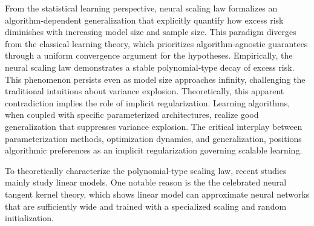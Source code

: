 From the statistical learning perspective, neural scaling law formalizes an algorithm-dependent generalization that explicitly quantify how excess risk diminishes with increasing model size and sample size. This paradigm diverges from the classical learning theory, which prioritizes algorithm-agnostic guarantees through a uniform convergence argument for the hypotheses. Empirically, the neural scaling law demonstrates a stable polynomial-type decay of excess risk. This phenomenon persists even as model size approaches infinity, challenging the traditional intuitions about variance explosion. Theoretically, this apparent contradiction implies the role of implicit regularization. Learning algorithms, when coupled with specific parameterized architectures, realize good generalization that suppresses variance explosion. The critical interplay between parameterization methods, optimization dynamics, and generalization, positions algorithmic preferences as an implicit regularization governing scalable learning.


\iffalse
 To theoretically characterize the polynomial-type scaling law, recent studies mainly study linear models.   One notable reason is the   the celebrated neural tangent
kernel theory, which shows  linear model can approximate neural networks that are sufficiently wide and trained with a specialized scaling and random initialization. 
  

 
 
 
 
